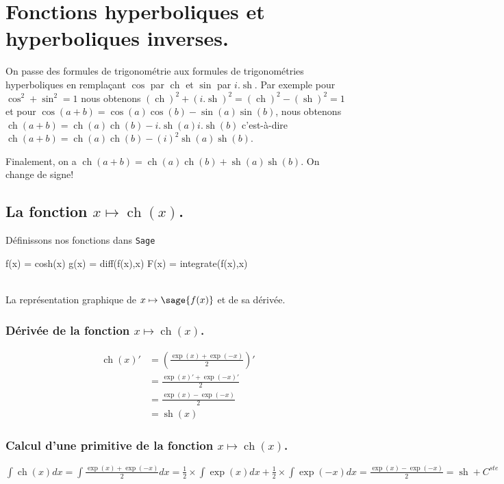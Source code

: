 \documentclass[a4paper,12pt]{report}
\renewcommand{\sinh}{\mathop{\mathrm{sh}}}
\renewcommand{\cosh}{\mathop{\mathrm{ch}}}
\begin{document}

\chapter{Fonctions hyperboliques et hyperboliques inverses.}


On passe des formules de trigonométrie aux formules de trigonométries hyperboliques en remplaçant $\cos$ par $\cosh$ et $\sin$ par $i . \sinh$. Par exemple pour $\cos^2+\sin^2=1$
nous obtenons $(\cosh)^2 + (i . \sinh)^2= (\cosh)^2 - (\sinh)^2 = 1$ et pour $\cos(a+b)=\cos(a) \cos(b) - \sin(a) \sin(b) $, nous obtenons $\cosh(a+b)=\cosh(a) \cosh(b) - i .\sinh(a) i . \sinh(b) $ c'est-à-dire $\cosh(a+b)=\cosh(a) \cosh(b) - (i)^2 \sinh(a) \sinh(b) $.  

Finalement, on a $\cosh(a+b) = \cosh(a) \cosh(b) + \sinh(a) \sinh(b) $. On change de signe!


\section{La fonction  $x \mapsto \cosh(x)$.}

Définissons nos fonctions dans {\texttt{Sage}}
\begin{sageblock}
    f(x) = cosh(x)
    g(x) = diff(f(x),x)
    F(x) = integrate(f(x),x)
\end{sageblock}



\begin{center}
 \\
La représentation graphique de $x \mapsto \sage{f(x)} $ et de sa dérivée. 
\end{center}

\subsection{Dérivée de la fonction $x \mapsto \cosh(x)$.}
\begin{align*}
\cosh(x)' & = \left( \frac{\exp(x)+\exp(-x)}{2} \right)' \\ 
& = \frac{\exp(x)'+\exp(-x)'}{2} \\
& = \frac{\exp(x)-\exp(-x)}{2} \\
& = \sinh(x)
\end{align*}

\subsection{Calcul d'une primitive de la fonction  $x \mapsto \cosh(x)$.}
$\int \cosh(x) dx = \int \frac{\exp(x)+ \exp(-x)}{2} dx = \frac{1}{2} \times \int \exp(x) dx + \frac{1}{2} \times \int \exp(-x) dx = \frac{ \exp(x) - \exp(-x) }{2} = \sinh + C^{ste}$
\end{document}
